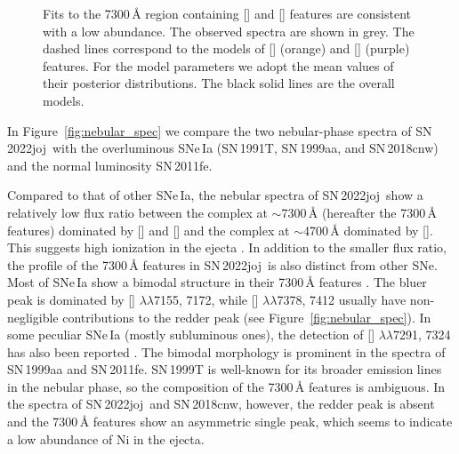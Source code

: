 \documentclass[twocolumn]{aastex631}
\newcommand{\sn}{SN\,2022joj}
\begin{document}
\begin{CJK*}{UTF8}{gbsn}
\begin{figure}
    \caption{Fits to the 7300\,\r{A} region containing [] and [] features are consistent with a low  abundance. The observed spectra are shown in grey. The dashed lines correspond to the models of [] (orange) and [] (purple) features. For the model parameters we adopt the mean values of their posterior distributions. The black solid lines are the overall models.}
    \label{fig:Fe_ni}
\end{figure}

In Figure~\ref{fig:nebular_spec} we compare the two nebular-phase spectra of \sn\ with the overluminous SNe\,Ia (SN\,1991T, SN\,1999aa, and SN\,2018cnw) and the normal luminosity SN\,2011fe.

Compared to that of other SNe\,Ia, the nebular spectra of \sn\ show a relatively low flux ratio between the complex at $\sim$7300\,\r{A} (hereafter the 7300\,\r{A} features) dominated by [] and [] and the complex at $\sim$4700\,\r{A} dominated by []. This suggests high ionization in the ejecta \citep{Wilk_2020}. In addition to the smaller flux ratio, the profile of the 7300\,\r{A} features in \sn\ is also distinct from other SNe. Most of SNe\,Ia show a bimodal structure in their 7300\,\r{A} features \citep[e.g.,][]{Graham_2017,Maguire_2018}. The bluer peak is dominated by [] $\lambda\lambda$7155, 7172, while [] $\lambda\lambda$7378, 7412 usually have non-negligible contributions to the redder peak (see Figure~\ref{fig:nebular_spec}). In some peculiar SNe\,Ia (mostly subluminous ones), the detection of [] $\lambda\lambda$7291, 7324 has also been reported \citep[e.g.][]{jacobson-galan_16hnk_2020,Siebert_19yvq_2020}. The bimodal morphology is prominent in the spectra of SN\,1999aa and SN\,2011fe. SN\,1999T is well-known for its broader emission lines in the nebular phase, so the composition of the 7300\,\r{A} features is ambiguous. In the spectra of \sn\ and SN\,2018cnw, however, the redder peak is absent and the 7300\,\r{A} features show an asymmetric single peak, which seems to indicate a low abundance of Ni in the ejecta.


\end{CJK*}
\end{document}
